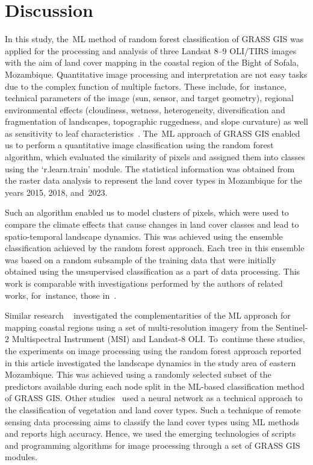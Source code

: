 \documentclass[coasts,article,accept,pdftex,oneauthor]{Definitions/mdpi}
\begin{document}
\section{Discussion}

In this study, the~ML method of random forest classification of GRASS GIS was applied for {the processing and analysis of }three Landsat 8--9 OLI/TIRS images {with the aim of }land cover mapping {in} the coastal region of the Bight of Sofala, Mozambique. Quantitative image processing and interpretation are not easy {tasks} due to the complex function of {multiple factors. These include, for~instance, }technical parameters of the image (sun, sensor, and target geometry), regional environmental effects (cloudiness, wetness, {heterogeneity, }diversification and fragmentation of landscapes,{ }topographic ruggedness, and slope curvature) {as well as} sensitivity to leaf characteristics~\cite{Mitchard}. The~ML approach of GRASS GIS enabled{ us }to perform a quantitative image classification using the random forest algorithm,{ }which evaluated the similarity of pixels and {assigned} them into classes using {the} `r.learn.train' module. {The} statistical information {was obtained }from the raster data analysis {to }represent{ }the land cover types in Mozambique for{ the }years 2015, 2018, and~2023. 

{Such} an algorithm enabled us to model{ }clusters of pixels{, }which {were} used to compare the climate effects {that cause} changes in land cover classes and {lead to spatio-temporal }landscape {dynamics}. This was achieved using the ensemble classification {achieved by the random forest approach}{. }Each tree in {this} ensemble was based on a random subsample of the training data that were initially obtained using {the }unsupervised classification as a part of data processing. This work is comparable with investigations performed by {the authors of }related works{, for~instance,} those in~\cite{FERNANDO2023,KOLARIK2024111445}. 

{Similar research} ~\cite{BERA20234691,land12122149,ZHANG2023108250} investigated the complementarities of the ML approach for mapping coastal regions using a set of multi-resolution imagery from the Sentinel-2 Multispectral Instrument (MSI) and Landsat-8 OLI. To~continue these studies, the experiments on image processing using the random forest approach reported in this article  investigated the landscape dynamics in the study area of eastern Mozambique{. This was achieved }using a randomly selected subset of the predictors available during each node split in the ML-based classification method of GRASS GIS. Other studies~\cite{MOUNTRAKIS2023106,SINGH2021100645,ZHENG2023100974} used a neural network {as a technical approach to the classification of} vegetation and land cover {types. Such a }technique {of} remote sensing data processing {{aims} to classify the }land cover types using ML methods and {reports} high accuracy. {Hence, {we used the} emerging technologies of scripts and programming algorithms for image processing through a {set} of {GRASS GIS} modules{.}}
\end{document}
